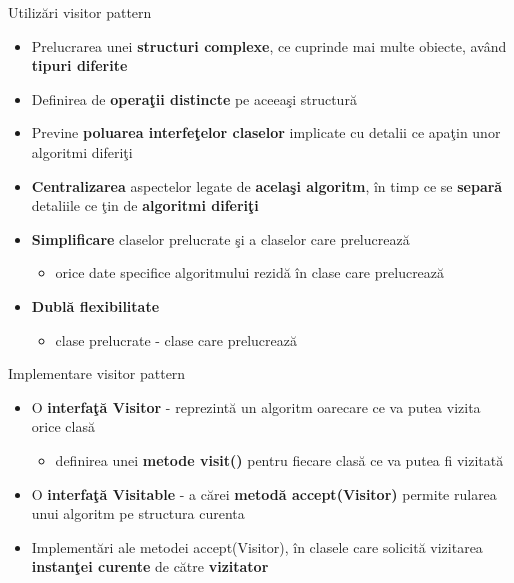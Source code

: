 \documentclass{beamer}
\begin{document}
\begin{frame}{Utilizări visitor pattern}
	\begin{itemize}
		\item Prelucrarea unei \textbf{structuri complexe}, ce cuprinde mai multe obiecte, având \textbf{tipuri diferite}
		\vspace{4mm}
		\item Definirea de \textbf{operaţii distincte} pe aceeaşi structură
		\vspace{4mm}
		\item Previne \textbf{poluarea interfeţelor claselor} implicate cu detalii ce apaţin unor algoritmi diferiţi
		\vspace{4mm}
		\item \textbf{Centralizarea} aspectelor legate de \textbf{acelaşi algoritm}, în timp ce se \textbf{separă} detaliile ce ţin de \textbf{algoritmi diferiţi}
		\vspace{4mm}
		\item \textbf{Simplificare} claselor prelucrate şi a claselor care prelucrează
			\begin{itemize}
				\item orice date specifice algoritmului rezidă în clase care prelucrează
			\end{itemize}
		\vspace{4mm}
		\item \textbf{Dublă flexibilitate}
			\begin{itemize}
				\item clase prelucrate - clase care prelucrează
			\end{itemize}
	\end{itemize}
\end{frame}

\begin{frame}{Implementare visitor pattern}
	\begin{itemize}
		\item O \textbf{interfaţă Visitor} - reprezintă un algoritm oarecare ce va putea vizita orice clasă
			\begin{itemize}
				\item definirea unei \textbf{metode visit()} pentru fiecare clasă ce va putea fi vizitată
			\end{itemize}
		\vspace{4mm}
		\item O \textbf{interfaţă Visitable} - a cărei \textbf{metodă accept(Visitor)} permite rularea unui algoritm pe structura curenta
		\vspace{4mm}
		\item Implementări ale metodei accept(Visitor), în clasele care solicită vizitarea \textbf{instanţei curente} de către \textbf{vizitator}
	\end{itemize}
\end{frame}
\end{document}
